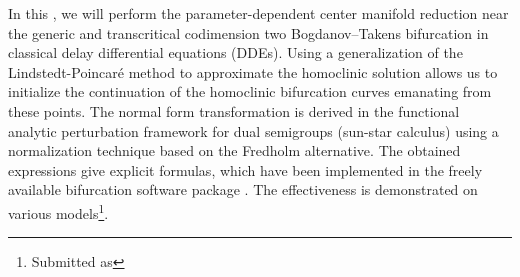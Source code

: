 In this \paper{}, we will perform the parameter-dependent center manifold reduction
near the generic and transcritical codimension two Bogdanov--Takens bifurcation
in classical delay differential equations (DDEs). Using a generalization of the
Lindstedt-Poincar\'e method to approximate the homoclinic solution allows us to
initialize the continuation of the homoclinic bifurcation curves emanating from
these points. The normal form transformation is derived in the functional
analytic perturbation framework for dual semigroups (sun-star calculus) using a
normalization technique based on the Fredholm alternative. The obtained
expressions give explicit formulas, which have been implemented in the freely
available bifurcation software package \DDEBIFTOOL. The effectiveness is
demonstrated on various models\ifthesis\footnote{Submitted as}\fi.

